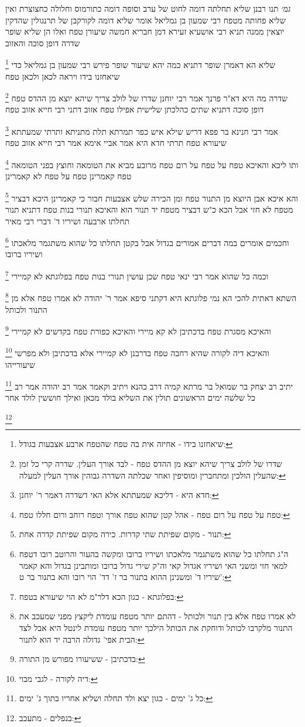 \documentclass[12pt, openany]{book}
\newcommand{\footnotecomment}[1]{
	\renewcommand\thefootnote{}
	\footnote{#1}}
\newcommand{\commenta}[1]{\footnotecomment{#1}}
\begin{document}
{{\large\emph{גמ׳}} תנו רבנן שליא תחלתה דומה לחוט של ערב וסופה דומה כתורמוס וחלולה כחצוצרת ואין שליא פחותה מטפח רבי שמעון בן גמליאל אומר שליא דומה לקורקבן של תרנגולין שהדקין יוצאין ממנה 
תניא רבי אושעיא זעירא דמן חבריא חמשה שיעורן טפח ואלו הן שליא שופר שדרה דופן סוכה והאזוב 
\commenta{שיאחזנו בידו - אחיזה אית בה טפח שהטפח ארבע אצבעות בגודל:}
שליא הא דאמרן שופר דתניא כמה יהא שיעור שופר פירש רבי שמעון בן גמליאל כדי שיאחזנו בידו ויראה לכאן ולכאן טפח 
\commenta{שדרו של לולב צריך שיהא יוצא מן ההדס טפח - לבד אורך העלין. שדרה קרי כל זמן שהעלין הולכין ומתחברין ומוסיפין ואחר שכלתה השדרה גבוהין אורך העלין למעלה:}
שדרה מה היא דא"ר פרנך אמר רבי יוחנן שדרו של לולב צריך שיהא יוצא מן ההדס טפח דופן סוכה דתניא שתים כהלכתן שלישית אפילו טפח אזוב דתני רבי חייא אזוב טפח 
\commenta{חדא היא - דליכא שמעתתא אלא האי דשדרה דאמר ר' יוחנן:}
אמר רבי חנינא בר פפא דריש שילא איש כפר תמרתא תלת מתניתא ותרתי שמעתתא שיעורא טפח תרתי חדא היא אמר אביי אימא אמר רבי חייא אזוב טפח 
\commenta{טפח על טפח על רום טפח - אהל קטן שהוא טפח אורך וטפח רוחב ורום חללו טפח:}
ותו ליכא והאיכא טפח על טפח על רום טפח מרובע מביא את הטומאה וחוצץ בפני הטומאה 
טפח קאמרינן טפח על טפח לא קאמרינן 
\commenta{תנור - מקום שפיתת שתי קדרות. כירה מקום שפיתת קדרה אחת:}
והא איכא אבן היוצא מן התנור טפח ומן הכירה שלש אצבעות חבור 
כי קאמרינן היכא דבציר מטפח לא חזי אבל הכא כ"ש דבציר מטפח יד תנור הוא 
והאיכא
תנורי בנות טפח דתניא תנור תחלתו ארבעה ושיריו ד' דברי רבי מאיר 
\commenta{ה"ג תחלתו כל שהוא משתגמר מלאכתו ושיריו ברובו ומקשה בהעור והרוטב רובו דטפח למאי חזי ומשני האי ושיריו אגדול קאי וה"ק שירי גדול ברובו ומותבינן בגדול והא קאמר שיריו ד' ומשנינן ההוא בתנור בר ז' דד' הוי רובו והא בתנור בר ט':}
וחכמים אומרים במה דברים אמורים בגדול אבל בקטן תחלתו כל שהוא משתגמר מלאכתו ושיריו ברובו 
\commenta{בפלוגתא - כגון הכא דלר"מ לא הוי שיעורא בטפח:}
וכמה כל שהוא אמר רבי ינאי טפח שכן עושין תנורי בנות טפח בפלוגתא לא קמיירי 
\commenta{לא אמרו טפח אלא בין תנור ולכותל - דהתם יותר מטפח עומדת ליקצץ מפני שמעכב את התנור מלקרבו לכותל ודוחקת את הכותל הילכך יותר מטפח עומדת לינטל היא אבל לצד הבית אפי' גדולה הרבה יד הוא לתנור:}
השתא דאתית להכי הא נמי פלוגתא היא דקתני סיפא אמר ר' יהודה לא אמרו טפח אלא מן התנור ולכותל 
\commenta{בדכתיבן - ששיעורו מפורש מן התורה:}
והאיכא מסגרת טפח בדכתיבן לא קא מיירי והאיכא כפורת טפח בקדשים לא קמיירי 
\commenta{דיה לקורה - לגבי מבוי:}
והאיכא דיה לקורה שהיא רחבה טפח בדרבנן לא קמיירי אלא בדכתיבן ולא מפרשי שיעורייהו 
\commenta{כל ג' ימים - כגון יצא ולד תחלה ושליא אחריו בתוך ג' ימים:}
יתיב רב יצחק בר שמואל בר מרתא קמיה דרב כהנא ויתיב וקאמר אמר רב יהודה אמר רב כל שלשה ימים הראשונים תולין את השליא בולד מכאן ואילך חוששין לולד אחר 
\commenta{בנפלים - מתעכב:}
}
\end{document}
